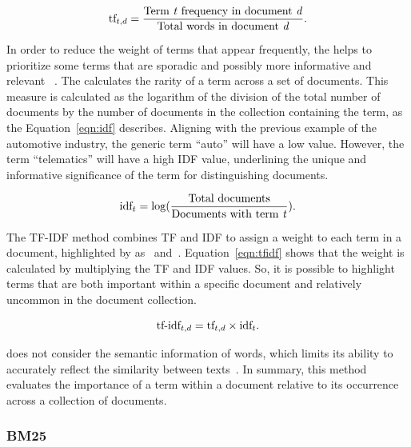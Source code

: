 \begin{equation}
    \textup{tf}_{t,d} = \frac{\text{Term \textit{t} frequency in document \textit{d}}}{\text{Total words in document \textit{d}}}.
    \label{eqn:tf}
\end{equation}

In order to reduce the weight of terms that appear frequently, the {\idf} helps to prioritize some terms that are sporadic and possibly more informative and relevant~\cite{liang_research_2022} . The {\idf} calculates the rarity of a term across a set of documents. This measure is calculated as the logarithm of the division of the total number of documents by the number of documents in the collection containing the term, as the Equation~\ref{eqn:idf} describes. Aligning with the previous example of the automotive industry, the generic term ``auto'' will have a low {\idf} value. However, the term ``telematics'' will have a high IDF value, underlining the unique and informative significance of the term for distinguishing documents.

\begin{equation}
    \textup{idf}_{t} = \log(\frac{\text{Total documents}}{\text{Documents with term \textit{t}}}).
    \label{eqn:idf}
\end{equation}

The TF-IDF method combines TF and IDF to assign a weight to each term in a document, highlighted by as~\citet{manning_introduction_2009} and~\citet{lan_research_2022}. Equation~\ref{eqn:tfidf} shows that the weight is calculated by multiplying the TF and IDF values. So, it is possible to highlight terms that are both important within a specific document and relatively uncommon in the document collection.

\begin{equation}
    \textup{tf-idf}_{t,d} = \textup{tf}_{t,d} \times \textup{idf}_{t}.
    \label{eqn:tfidf}
\end{equation}

{\tfidf} does not consider the semantic information of words, which limits its ability to accurately reflect the similarity between texts~\cite{lan_research_2022}. In summary, this {\ir} method evaluates the importance of a term within a document relative to its occurrence across a collection of documents.


\subsubsection{BM25}
\label{bm25}

